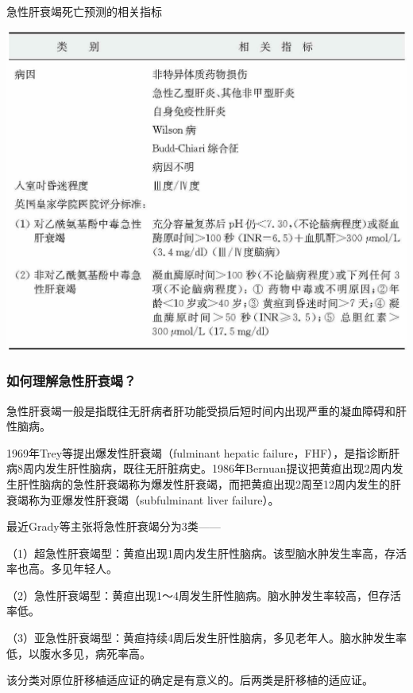 \begin{table}[htbp]
\centering
\caption{急性肝衰竭死亡预测的相关指标}
\label{tab13-1}
\includegraphics{./images/Image00103.jpg}
\end{table}

\subsubsection{如何理解急性肝衰竭？}

急性肝衰竭一般是指既往无肝病者肝功能受损后短时间内出现严重的凝血障碍和肝性脑病。

1969年Trey等提出爆发性肝衰竭（fulminant hepatic
failure，FHF），是指诊断肝病8周内发生肝性脑病，既往无肝脏病史。1986年Bernuan提议把黄疸出现2周内发生肝性脑病的急性肝衰竭称为爆发性肝衰竭，而把黄疸出现2周至12周内发生的肝衰竭称为亚爆发性肝衰竭（subfulminant
liver failure）。

最近Grady等主张将急性肝衰竭分为3类------

（1）超急性肝衰竭型：黄疸出现1周内发生肝性脑病。该型脑水肿发生率高，存活率也高。多见年轻人。

（2）急性肝衰竭型：黄疸出现1～4周发生肝性脑病。脑水肿发生率较高，但存活率低。

（3）亚急性肝衰竭型：黄疸持续4周后发生肝性脑病，多见老年人。脑水肿发生率低，以腹水多见，病死率高。

该分类对原位肝移植适应证的确定是有意义的。后两类是肝移植的适应证。

